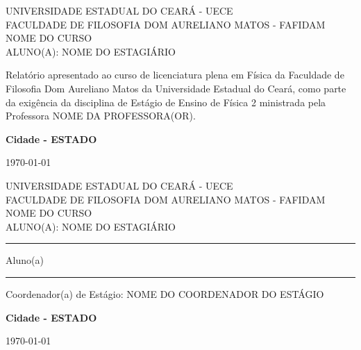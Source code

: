 \documentclass[a4paper, 12 pt]{article}                                	%
\begin{document}
	
	\newpage
	\begin{center}
		UNIVERSIDADE ESTADUAL DO CEARÁ - UECE\\ \vspace{0.5cm}
		FACULDADE DE FILOSOFIA DOM AURELIANO MATOS - FAFIDAM\\ \vspace{0.5cm}
		NOME DO CURSO \\ \vspace{0.5cm}
		ALUNO(A):\textnormal{ NOME DO ESTAGIÁRIO} \\ \vspace{8cm}
		
		\begin{flushright}
			\hspace*{8cm}\parbox{8.5cm}{{Relatório apresentado ao curso de licenciatura plena em Física da Faculdade de Filosofia Dom Aureliano Matos da Universidade Estadual do Ceará, como parte da exigência da disciplina de Estágio de Ensino de Física 2 ministrada pela Professora NOME DA PROFESSORA(OR).}}
			
		\end{flushright}
		
		\vspace{8cm}
		\textbf{Cidade - ESTADO}
		
		\vspace{0.5cm}
		\today{}		%
	\end{center}
	\thispagestyle{empty}
	\newpage 
	



	\begin{center}
	UNIVERSIDADE ESTADUAL DO CEARÁ - UECE\\ \vspace{0.5cm}
	FACULDADE DE FILOSOFIA DOM AURELIANO MATOS - FAFIDAM\\ \vspace{0.5cm}
	NOME DO CURSO \\ \vspace{0.5cm}
	ALUNO(A):\textnormal{ NOME DO ESTAGIÁRIO} \\ \vspace{5cm}
		
		\rule{15 cm}{0.008 cm}
		Aluno(a)
		
		\vspace{5 cm}
		
		\rule{15 cm}{0.008 cm}
		Coordenador(a) de Estágio: NOME DO COORDENADOR DO ESTÁGIO
		
		\vspace{9 cm}
		\textbf{Cidade - ESTADO}
		
		\today{}			%
		
	\end{center}
	\thispagestyle{empty}
\end{document}
